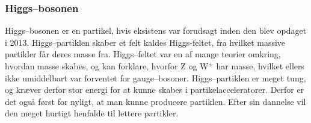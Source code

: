 \subsubsection{Higgs--bosonen}
Higgs--bosonen er en partikel, hvis eksistens var forudsagt inden den
blev opdaget i 2013. Higgs--partiklen skaber et felt kaldes
Higgs-feltet, fra hvilket massive partikler får deres masse
fra. Higgs--feltet var en af mange teorier omkring, hvordan masse
skabes, og kan forklare, hvorfor Z og $\text{W}^\pm$ har masse,
hvilket ellers ikke umiddelbart var forventet for
gauge--bosoner. Higgs--partiklen er meget tung, og kræver derfor stor
energi for at kunne skabes i partikelacceleratorer. Derfor er det også
først for nyligt, at man kunne producere partiklen. Efter sin dannelse
vil den meget hurtigt henfalde til lettere partikler.

